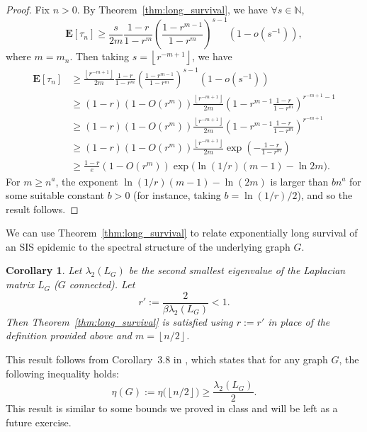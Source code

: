 \documentclass[11pt]{article}
\newtheorem{corollary}{Corollary}[theorem]
\begin{document}
\begin{proof}
Fix $n>0$. By Theorem~\ref{thm:long_survival}, we have $\forall s\in \mathbb{N}$,
$$\mathbf{E}[\tau_n] \geq \frac{s}{2m} \frac{1-r}{1-r^m} \left( \frac{1-r^{m-1}}{1-r^m}\right)^{s-1} \left( 1-o(s^{-1})\right),$$
where $m=m_n$. Then taking $s= \left \lfloor{r^{-m+1}} \right \rfloor$, we have
$$\begin{aligned}
\mathbf{E}[\tau_n] &\geq \frac{\left \lfloor{r^{-m+1}} \right \rfloor}{2m} \frac{1-r}{1-r^m} \left( \frac{1-r^{m-1}}{1-r^m}\right)^{s-1} \left( 1-o(s^{-1})\right) \\
	&\geq (1-r)(1-O(r^m)) \frac{\left \lfloor{r^{-m+1}} \right \rfloor}{2m} \left(1-r^{m-1} \frac{1-r}{1-r^m}\right)^{r^{-m+1}-1} \\
	&\geq (1-r)(1-O(r^m)) \frac{\left \lfloor{r^{-m+1}} \right \rfloor}{2m} \left(1-r^{m-1} \frac{1-r}{1-r^m}\right)^{r^{-m+1}} \\
	&\geq (1-r)(1-O(r^m)) \frac{\left \lfloor{r^{-m+1}} \right \rfloor}{2m} \exp\left( -\frac{1-r}{1-r^m}\right) \\
	&\geq \frac{1-r}{e} (1-O(r^m)) \exp\Big(\ln(1/r)(m-1)-\ln 2m\Big).
\end{aligned}$$
For $m\geq n^a$, the exponent $\ln(1/r)(m-1)-\ln(2m)$ is larger than $bn^a$ for some suitable constant $b>0$ (for instance, taking $b=\ln(1/r)/2$), and so the result follows.
\end{proof}

We can use Theorem~\ref{thm:long_survival} to relate exponentially long survival of an SIS epidemic to the spectral structure of the underlying graph $G$.

\begin{corollary} \label{cor:spectral_long_survival}
Let $\lambda_2(L_G)$ be the second smallest eigenvalue of the Laplacian matrix $L_G$ ($G$ connected). Let
$$r':= \frac{2}{\beta \lambda_2(L_G)} < 1.$$
Then Theorem~\ref{thm:long_survival} is satisfied using $r:=r'$ in place of the definition provided above and $m=\left \lfloor{n/2}\right \rfloor$.
\end{corollary}

This result follows from Corollary~3.8 in \cite{mohar:laplace_eigs}, which states that for any graph $G$, the following inequality holds:
$$\eta(G) := \eta\big(\left \lfloor{n/2}\right \rfloor\big) \geq \frac{\lambda_2(L_G)}{2}.$$
This result is similar to some bounds we proved in class and will be left as a future exercise.




\end{document}
